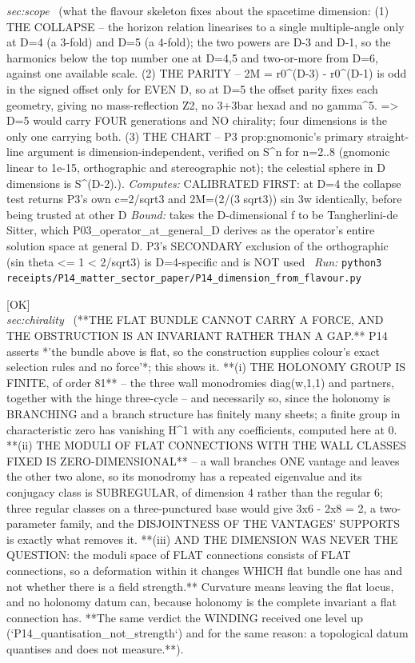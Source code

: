 \begin{description}
\textit{sec:scope} \ (what the flavour skeleton fixes about the spacetime dimension: (1) THE COLLAPSE -- the horizon relation linearises to a single multiple-angle only at D=4 (a 3-fold) and D=5 (a 4-fold); the two powers are D-3 and D-1, so the harmonics below the top number one at D=4,5 and two-or-more from D=6, against one available scale. (2) THE PARITY -- 2M = r0\textasciicircum{}(D-3) - r0\textasciicircum{}(D-1) is odd in the signed offset only for EVEN D, so at D=5 the offset parity fixes each geometry, giving no mass-reflection Z2, no 3+3bar hexad and no gamma\textasciicircum{}5. => D=5 would carry FOUR generations and NO chirality; four dimensions is the only one carrying both. (3) THE CHART -- P3 prop:gnomonic's primary straight-line argument is dimension-independent, verified on S\textasciicircum{}n for n=2..8 (gnomonic linear to 1e-15, orthographic and stereographic not); the celestial sphere in D dimensions is S\textasciicircum{}(D-2).). 
\emph{Computes:} CALIBRATED FIRST: at D=4 the collapse test returns P3's own c=2/sqrt3 and 2M=(2/(3 sqrt3)) sin 3w identically, before being trusted at other D
 \emph{Bound:} takes the D-dimensional f to be Tangherlini-de Sitter, which P03\_operator\_at\_general\_D derives as the operator's entire solution space at general D. P3's SECONDARY exclusion of the orthographic (sin theta <= 1 < 2/sqrt3) is D=4-specific and is NOT used
\ \emph{Run:} \texttt{python3 receipts/P14\_matter\_sector\_paper/P14\_dimension\_from\_flavour.py}
\item[\rcptlabel{P14_the_flat_bundle_cannot_carry_a_force}{P14R51}\textbf{P14R51}\quad\texttt{P14\_the\_flat\_bundle\_cannot\_carry\_a\_force}]\hfill\textsf{[OK]}\\
\textit{sec:chirality} \ (**THE FLAT BUNDLE CANNOT CARRY A FORCE, AND THE OBSTRUCTION IS AN INVARIANT RATHER THAN A GAP.** P14 asserts *'the bundle above is flat, so the construction supplies colour's exact selection rules and no force'*; this shows it. **(i) THE HOLONOMY GROUP IS FINITE, of order 81** -- the three wall monodromies diag(w,1,1) and partners, together with the hinge three-cycle -- and necessarily so, since the holonomy is BRANCHING and a branch structure has finitely many sheets; a finite group in characteristic zero has vanishing H\textasciicircum{}1 with any coefficients, computed here at 0. **(ii) THE MODULI OF FLAT CONNECTIONS WITH THE WALL CLASSES FIXED IS ZERO-DIMENSIONAL** -- a wall branches ONE vantage and leaves the other two alone, so its monodromy has a repeated eigenvalue and its conjugacy class is SUBREGULAR, of dimension 4 rather than the regular 6; three regular classes on a three-punctured base would give 3x6 - 2x8 = 2, a two-parameter family, and the DISJOINTNESS OF THE VANTAGES' SUPPORTS is exactly what removes it. **(iii) AND THE DIMENSION WAS NEVER THE QUESTION: the moduli space of FLAT connections consists of FLAT connections, so a deformation within it changes WHICH flat bundle one has and not whether there is a field strength.** Curvature means leaving the flat locus, and no holonomy datum can, because holonomy is the complete invariant a flat connection has. **The same verdict the WINDING received one level up (`P14\_quantisation\_not\_strength`) and for the same reason: a topological datum quantises and does not measure.**). 

\end{description}

